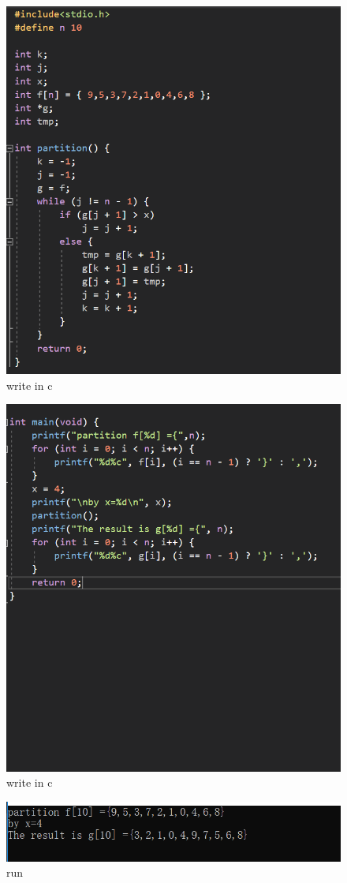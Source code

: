 \documentclass[11pt,a4paper,fleqn]{article}
\begin{document}
\begin{figure}[h!]
\centering
\includegraphics{4.png}
\caption{ write in c}
\label{fig}
\end{figure}

\begin{figure}[h!]
\centering
\includegraphics{5.png}
\caption{ write in c}
\label{fig}
\end{figure}

\begin{figure}[h!]
\centering
\includegraphics{6.png}
\caption{ run }
\label{fig}
\end{figure}



%
%
\end{document}
